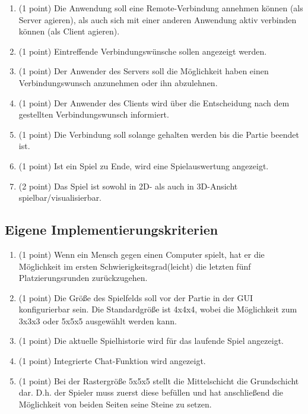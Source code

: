 \documentclass[a4paper]{scrartcl}
\begin{document}
\begin{enumerate}
		\item (1 point) Die Anwendung soll eine Remote-Verbindung annehmen können (als Server agieren), als auch sich mit einer anderen Anwendung aktiv verbinden können (als Client agieren).
		\item (1 point) Eintreffende Verbindungswünsche sollen angezeigt werden.
		\item (1 point) Der Anwender des Servers soll die Möglichkeit haben einen Verbindungswunsch anzunehmen oder ihn abzulehnen.
		\item (1 point) Der Anwender des Clients wird über die Entscheidung nach dem gestellten Verbindungswunsch informiert.
		\item (1 point) Die Verbindung soll solange gehalten werden bis die Partie beendet ist.
		\item (1 point) Ist ein Spiel zu Ende, wird eine Spielauswertung angezeigt.
		\item (2 point) Das Spiel ist sowohl in 2D- als auch in 3D-Ansicht spielbar/visualisierbar.
	\end{enumerate}
		
\subsection{Eigene Implementierungskriterien}
	\begin{enumerate}
		\item (1 point) Wenn ein Mensch gegen einen Computer spielt, hat er die Möglichkeit im ersten Schwierigkeitsgrad(leicht) die letzten fünf Platzierungsrunden zurückzugehen.
		\item (1 point) Die Größe des Spielfelds soll vor der Partie in der GUI konfigurierbar sein. Die Standardgröße ist 4x4x4, wobei die Möglichkeit zum 3x3x3 oder 5x5x5 ausgewählt werden kann.
		\item (1 point) Die aktuelle Spielhistorie wird für das laufende Spiel angezeigt.
		\item (1 point) Integrierte Chat-Funktion wird angezeigt. 
		\item (1 point) Bei der Rastergröße 5x5x5 stellt die Mittelschicht die Grundschicht dar. D.h. der Spieler muss zuerst diese befüllen und hat anschließend die Möglichkeit von beiden Seiten seine Steine zu setzen. 
	\end{enumerate}
\end{document}
